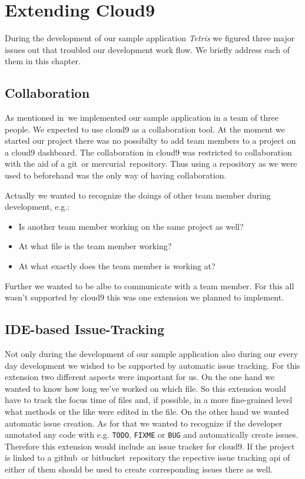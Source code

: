 \section{Extending Cloud9}
\label{sec:Approaches}
During the development of our sample application \emph{Tetris} we figured three major issues out that troubled our development work flow.
We briefly address each of them in this chapter.

\subsection{Collaboration}
As mentioned in~ we implemented our sample application in a team of three people.
We expected to use cloud9 as a collaboration tool.
At the moment we started our project there was no possibilty to add team members to a project on a cloud9 dashboard.
The collaboration in cloud9 was restricted to collaboration with the aid of a git~\needcite or mercurial~\needcite repository.
Thus using a repository as we were used to beforehand was the only way of having collaboration.

Actually we wanted to recognize the doings of other team member during development, e.g.:
\begin{itemize}
	\item Is another team member working on the same project as well?
	\item At what file is the team member working?
	\item At what exactly does the team member is working at?
\end{itemize}
Further we wanted to be albe to communicate with a team member.
For this all wasn't supported by cloud9 this was one extension we planned to implement.

\subsection{IDE-based Issue-Tracking}
Not only during the development of our sample application also during our every day development we wished to be supported by automatic issue tracking.
For this extension two different aspects were important for us.
On the one hand we wanted to know how long we've worked on which file.
So this extension would have to track the focus time of files and, if possible, in a more fine-grained level what methods or the like were edited in the file.
On the other hand we wanted automatic issue creation.
As for that we wanted to recognize if the developer annotated any code with e.g. \texttt{TODO}, \texttt{FIXME} or \texttt{BUG} and automatically create issues.
Therefore this extension would include an issue tracker for cloud9.
If the project is linked to a github~\needcite or bitbucket~\needcite repository the repective issue tracking api of either of them should be used to create corresponding issues there as well.

